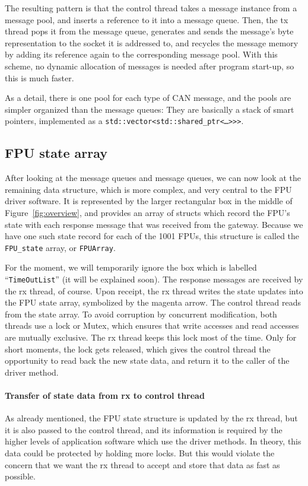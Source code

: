 \documentclass[fontsize=12,a4paper]{scrartcl}
\begin{document}
The resulting pattern is that the control thread takes a message
instance from a message pool, and inserts a reference to it into a
message queue. Then, the tx thread pops it from the message queue,
generates and sends the message's byte representation to the socket it
is addressed to, and recycles the message memory by adding its
reference again to the corresponding message pool. With this scheme,
no dynamic allocation of messages is needed after program start-up, so
this is much faster.

As a detail, there is one pool for each type of CAN message, and the
pools are simpler organized than the message queues: They are
basically a stack of smart pointers, implemented as a
\texttt{std::vector<std::shared\_ptr<\ldots>>>}.

\subsection{FPU state array}

After looking at the message queues and message queues, we can now
look at the remaining data structure, which is more complex, and very
central to the FPU driver software. It is represented by the larger
rectangular box in the middle of Figure~\ref{fig:overview}, and
provides an array of structs which record the FPU's state with each
response message that was received from the gateway. Because we have
one such state record for each of the 1001 FPUs, this structure is
called the \texttt{FPU\_state} array, or \texttt{FPUArray}.

For the moment, we will temporarily ignore the box which is labelled
``\texttt{TimeOutList}'' (it will be explained soon).  The response
messages are received by the rx thread, of course.  Upon receipt, the
rx thread writes the state updates into the FPU state array,
symbolized by the magenta arrow. The control thread reads from the
state array. To avoid corruption by concurrent modification, both
threads use a lock or Mutex, which ensures that write accesses and
read accesses are mutually exclusive. The rx thread keeps this lock
most of the time. Only for short moments, the lock gets released,
which gives the control thread the opportunity to read back the new
state data, and return it to the caller of the driver method.

\paragraph{Transfer of state data from rx to control thread}
As already mentioned, the FPU state structure is updated by the rx
thread, but it is also passed to the control thread, and its
information is required by the higher levels of application software
which use the driver methods. In theory, this data could be protected
by holding more locks. But this would violate the concern that we want
the rx thread to accept and store that data as fast as possible.
\end{document}
